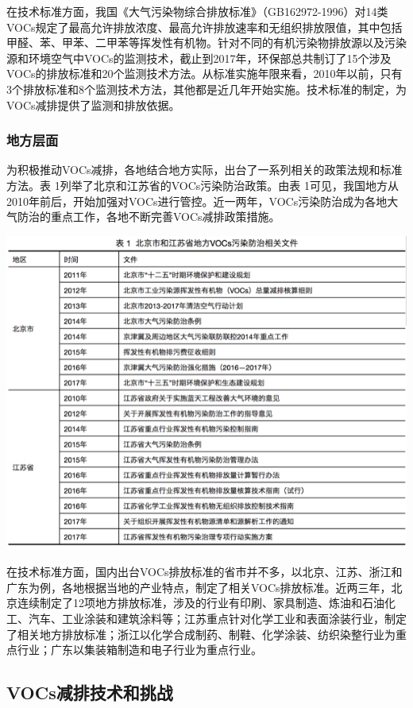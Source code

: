 \documentclass[]{book}
\begin{document}
在技术标准方面，我国《大气污染物综合排放标准》（GB162972-1996）对14类VOCs规定了最高允许排放浓度、最高允许排放速率和无组织排放限值，其中包括甲醛、苯、甲苯、二甲苯等挥发性有机物。针对不同的有机污染物排放源以及污染源和环境空气中VOCs的监测技术，截止到2017年，环保部总共制订了15个涉及VOCs的排放标准和20个监测技术方法。从标准实施年限来看，2010年以前，只有3个排放标准和8个监测技术方法，其他都是近几年开始实施。技术标准的制定，为VOCs减排提供了监测和排放依据。

\hypertarget{ux5730ux65b9ux5c42ux9762}{%
\subsubsection{地方层面}\label{ux5730ux65b9ux5c42ux9762}}

为积极推动VOCs减排，各地结合地方实际，出台了一系列相关的政策法规和标准方法。表 1列举了北京和江苏省的VOCs污染防治政策。由表 1可见，我国地方从2010年前后，开始加强对VOCs进行管控。近一两年，VOCs污染防治成为各地大气防治的重点工作，各地不断完善VOCs减排政策措施。

\includegraphics[width=8.33in]{images/voc7}

在技术标准方面，国内出台VOCs排放标准的省市并不多，以北京、江苏、浙江和广东为例，各地根据当地的产业特点，制定了相关VOCs排放标准。近两三年，北京连续制定了12项地方排放标准，涉及的行业有印刷、家具制造、炼油和石油化工、汽车、工业涂装和建筑涂料等；江苏重点针对化学工业和表面涂装行业，制定了相关地方排放标准；浙江以化学合成制药、制鞋、化学涂装、纺织染整行业为重点行业；广东以集装箱制造和电子行业为重点行业。

\hypertarget{vocsux51cfux6392ux6280ux672fux548cux6311ux6218}{%
\subsection{VOCs减排技术和挑战}\label{vocsux51cfux6392ux6280ux672fux548cux6311ux6218}}
\end{document}
